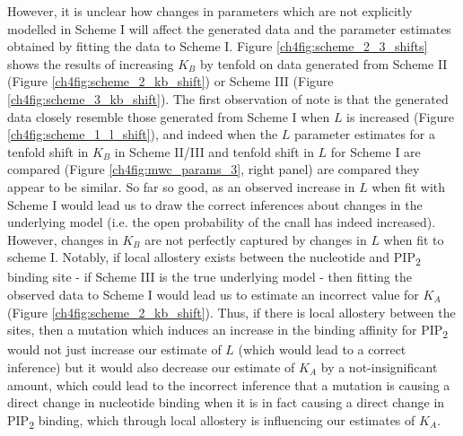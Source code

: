 However, it is unclear how changes in parameters which are not explicitly modelled in Scheme I will affect the generated data and the parameter estimates obtained by fitting the data to Scheme I.
Figure \ref{ch4fig:scheme_2_3_shifts} shows the results of increasing $K_B$ by tenfold on data generated from Scheme II (Figure \ref{ch4fig:scheme_2_kb_shift}) or Scheme III (Figure \ref{ch4fig:scheme_3_kb_shift}).
The first observation of note is that the generated data closely resemble those generated from Scheme I when $L$ is increased (Figure \ref{ch4fig:scheme_1_l_shift}), and indeed when the $L$ parameter estimates for a tenfold shift in $K_B$ in Scheme II/III and tenfold shift in $L$ for Scheme I are compared (Figure \ref{ch4fig:mwc_params_3}, right panel) are compared they appear to be similar.
So far so good, as an observed increase in $L$ when fit with Scheme I would lead us to draw the correct inferences about changes in the underlying model (i.e. the open probability of the cnall has indeed increased).
However, changes in $K_B$ are not perfectly captured by changes in $L$ when fit to scheme I.
Notably, if local allostery exists between the nucleotide and PIP\textsubscript{2} binding site - if Scheme III is the true underlying model - then fitting the observed data to Scheme I would lead us to estimate an incorrect value for $K_A$ (Figure \ref{ch4fig:scheme_2_kb_shift}).
Thus, if there is local allostery between the sites, then a mutation which induces an increase in the binding affinity for PIP\textsubscript{2} would not just increase our estimate of $L$ (which would lead to a correct inference) but it would also decrease our estimate of $K_A$ by a not-insignificant amount, which could lead to the incorrect inference that a mutation is causing a direct change in nucleotide binding when it is in fact causing a direct change in PIP\textsubscript{2} binding, which through local allostery is influencing our estimates of $K_A$.
